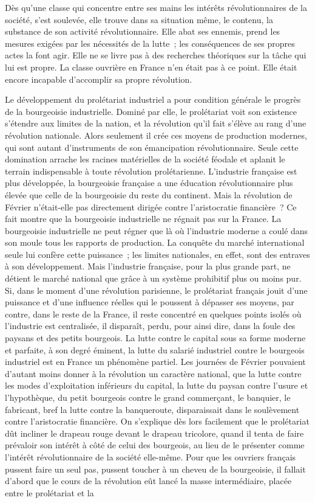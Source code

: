 \documentclass[twoside]{book} %
\begin{document}
Dès qu’une classe qui concentre entre ses mains les intérêts révolutionnaires de la société, s’est soulevée, elle trouve dans sa situation même, le contenu, la substance de son activité révolutionnaire. Elle abat ses ennemis, prend les mesures exigées par les nécessités de la lutte ; les conséquences de ses propres actes la font agir. Elle ne se livre pas à des recherches théoriques sur la tâche qui lui est propre. La classe ouvrière en France n’en était pas à ce point. Elle était encore incapable d’accomplir sa propre révolution.\par
Le développement du prolétariat industriel a pour condition générale le progrès de la bourgeoisie industrielle. Dominé par elle, le prolétariat voit son existence s’étendre aux limites de la nation, et la révolution qu’il fait s’élève au rang d’une révolution nationale. Alors seulement il crée ces moyens de production modernes, qui sont autant d’instruments de son émancipation révolutionnaire. Seule cette domination arrache les racines matérielles de la société féodale et aplanit le terrain indispensable à toute révolution prolétarienne. L’industrie française est plus développée, la bourgeoisie française a une éducation révolutionnaire plus élevée que celle de la bourgeoisie du reste du continent. Mais la révolution de Février n’était-elle pas directement dirigée contre l’aristocratie financière ? Ce fait montre que la bourgeoisie industrielle ne régnait pas sur la France. La bourgeoisie industrielle ne peut régner que là où l’industrie moderne a coulé dans son moule tous les rapports de production. La conquête du marché international seule lui confère cette puissance ; les limites nationales, en effet, sont des entraves à son développement. Mais l’industrie française, pour la plus grande part, ne détient le marché national que grâce à un système prohibitif plus ou moins pur. Si, dans le moment d’une révolution parisienne, le prolétariat français jouit d’une puissance et d’une influence réelles qui le poussent à dépasser ses moyens, par contre, dans le reste de la France, il reste concentré en quelques points isolés où l’industrie est centralisée, il disparaît, perdu, pour ainsi dire, dans la foule des paysans et des petits bourgeois. La lutte contre le capital sous sa forme moderne et parfaite, à son degré éminent, la lutte du salarié industriel contre le bourgeois industriel est en France un phénomène partiel. Les journées de Février pouvaient d’autant moins donner à la révolution un caractère national, que la lutte contre les modes d’exploitation inférieurs du capital, la lutte du paysan contre l’usure et l’hypothèque, du petit bourgeois contre le grand commerçant, le banquier, le fabricant, bref la lutte contre la banqueroute, disparaissait dans le soulèvement contre l’aristocratie financière. On s’explique dès lors facilement que le prolétariat dût incliner le drapeau rouge devant le drapeau tricolore, quand il tenta de faire prévaloir son intérêt à côté de celui des bourgeois, au lieu de le présenter comme l’intérêt révolutionnaire de la société elle-même. Pour que les ouvriers français pussent faire un seul pas, pussent toucher à un cheveu de la bourgeoisie, il fallait d’abord que le cours de la révolution eût lancé la masse intermédiaire, placée entre le prolétariat et la 
\end{document}
